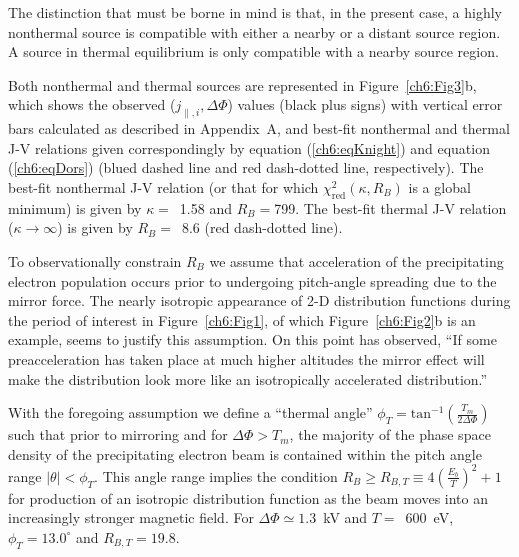   The distinction that must be borne in mind is that, in the present
  case, a highly nonthermal source is compatible with either a nearby
  or a distant source region. A source in thermal equilibrium is only
  compatible with a nearby source region.

  Both nonthermal and thermal sources are represented in
  Figure~\ref{ch6:Fig3}b, which shows the observed ($j_{\parallel,i},
  \Delta \Phi$) values (black plus signs) with vertical error bars
  calculated as described in Appendix~A, and best-fit nonthermal and
  thermal J-V relations given correspondingly by equation
  (\ref{ch6:eqKnight}) and equation (\ref{ch6:eqDors}) (blued dashed line and
  red dash-dotted line, respectively). The best-fit nonthermal J-V
  relation (or that for which $\chi^2_{\textrm{red}} ( \kappa, R_B )$
  is a global minimum) is given by $\kappa =$~1.58 and $R_B =$799. The
  best-fit thermal J-V relation ($\kappa \rightarrow \infty$) is given
  by $R_B =$~8.6 (red dash-dotted line).


  To observationally constrain $R_B$ we assume that acceleration of
  the precipitating electron population occurs prior to undergoing
  pitch-angle spreading due to the mirror force. The nearly isotropic
  appearance of 2-D distribution functions during the period of
  interest in Figure~\ref{ch6:Fig1}, of which Figure~\ref{ch6:Fig2}b is an
  example, seems to justify this assumption. On this point
  \citet{Bostrom2003a} has observed, ``If some preacceleration has
  taken place at much higher altitudes the mirror effect will make the
  distribution look more like an isotropically accelerated
  distribution.''

  With the foregoing assumption we define a ``thermal angle'' $\phi_T
  = \textrm{tan}^{-1} ( \frac{T_m}{2 \Delta \Phi} )$ such that prior
  to mirroring and for $\Delta \Phi > T_m$, the majority of the phase
  space density of the precipitating electron beam is contained within
  the pitch angle range $ \vert \theta \vert < \phi_T$.  This angle
  range implies the condition $R_B \geq R_{B,T} \equiv 4 (
  \frac{E_b}{T} )^2 + 1$ for production of an isotropic distribution
  function as the beam moves into an increasingly stronger magnetic
  field. For $\Delta \Phi \simeq 1.3$~kV and $T =$~600~eV, $\phi_T =
  13.0^\circ$ and $R_{B,T} = 19.8$.

